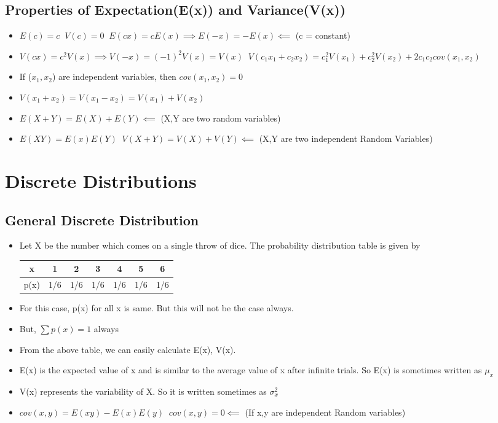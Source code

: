 \documentclass[8pt]{report}
\begin{document}
		\subsection{Properties of Expectation(E(x)) and Variance(V(x))}
			\begin{itemize}
				\item $\boxed{E(c)=c}\;\;\boxed{V(c)=0}\;\;\boxed{E(cx)=cE(x)\implies E(-x)=-E(x)}\impliedby$ (c = constant)
				\item $\boxed{V(cx)=c^2V(x)\implies V(-x)=(-1)^2V(x)=V(x)}\;\;\boxed{V(c_1x_1+c_2x_2)=c_1^2V(x_1)+c_2^2V(x_2)+2c_1c_2cov(x_1,x_2)}$
				\item If ($x_1,x_2$) are independent variables, then $cov(x_1,x_2)=0$
				\item $\boxed{V(x_1+x_2)=V(x_1-x_2)=V(x_1)+V(x_2)}$
				\item $\boxed{E(X+Y)=E(X)+E(Y)}\impliedby$ (X,Y are two random variables)
				\item $\boxed{E(XY)=E(x)E(Y)}\;\;\boxed{V(X+Y)=V(X)+V(Y)}\impliedby$ (X,Y are two independent Random Variables)
			\end{itemize}\hrulefill
	\section{Discrete Distributions}
		\subsection{General Discrete Distribution}
			\begin{itemize}
				\item Let X be the number which comes on a single throw of dice. The probability distribution table is given by
				\begin{table}[H]
					\centering
					\def\arraystretch{1.5}
					\begin{tabular}{|c|c|c|c|c|c|c|}
						\hline
						x & 1 & 2 & 3 & 4 & 5 & 6\\
						\hline
						p(x) & 1/6 & 1/6 & 1/6 & 1/6 & 1/6 & 1/6\\
						\hline 
					\end{tabular}
				\end{table}
				\item For this case, p(x) for all x is same. But this will not be the case always. 
				\item But, $\sum p(x) = 1$ always
				\item From the above table, we can easily calculate E(x), V(x).
				\item E(x) is the expected value of x and is similar to the average value of x after infinite trials. So E(x) is sometimes written as $\mu_x$
				\item V(x) represents the variability of X. So it is written sometimes as $\sigma_x^2$	
				\item $\boxed{cov(x,y)=E(xy)-E(x)E(y)}\;\;\boxed{cov(x,y)=0}\impliedby$ (If x,y are independent Random variables)											
			\end{itemize}\hrulefill
\end{document}
